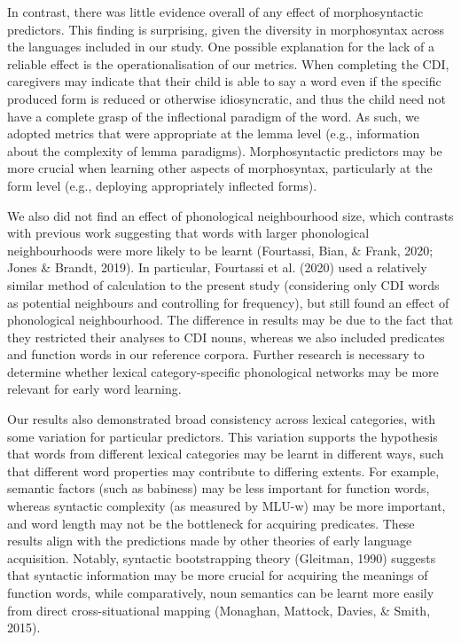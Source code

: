 \documentclass[10pt, letterpaper]{article}
\begin{document}
In contrast, there was little evidence overall of any effect of
morphosyntactic predictors. This finding is surprising, given the
diversity in morphosyntax across the languages included in our study.
One possible explanation for the lack of a reliable effect is the
operationalisation of our metrics. When completing the CDI, caregivers
may indicate that their child is able to say a word even if the specific
produced form is reduced or otherwise idiosyncratic, and thus the child
need not have a complete grasp of the inflectional paradigm of the word.
As such, we adopted metrics that were appropriate at the lemma level
(e.g., information about the complexity of lemma paradigms).
Morphosyntactic predictors may be more crucial when learning other
aspects of morphosyntax, particularly at the form level (e.g., deploying
appropriately inflected forms).

We also did not find an effect of phonological neighbourhood size, which
contrasts with previous work suggesting that words with larger
phonological neighbourhoods were more likely to be learnt (Fourtassi,
Bian, \& Frank, 2020; Jones \& Brandt, 2019). In particular, Fourtassi
et al. (2020) used a relatively similar method of calculation to the
present study (considering only CDI words as potential neighbours and
controlling for frequency), but still found an effect of phonological
neighbourhood. The difference in results may be due to the fact that
they restricted their analyses to CDI nouns, whereas we also included
predicates and function words in our reference corpora. Further research
is necessary to determine whether lexical category-specific phonological
networks may be more relevant for early word learning.

Our results also demonstrated broad consistency across lexical
categories, with some variation for particular predictors. This
variation supports the hypothesis that words from different lexical
categories may be learnt in different ways, such that different word
properties may contribute to differing extents. For example, semantic
factors (such as babiness) may be less important for function words,
whereas syntactic complexity (as measured by MLU-w) may be more
important, and word length may not be the bottleneck for acquiring
predicates. These results align with the predictions made by other
theories of early language acquisition. Notably, syntactic bootstrapping
theory (Gleitman, 1990) suggests that syntactic information may be more
crucial for acquiring the meanings of function words, while
comparatively, noun semantics can be learnt more easily from direct
cross-situational mapping (Monaghan, Mattock, Davies, \& Smith, 2015).
\end{document}
